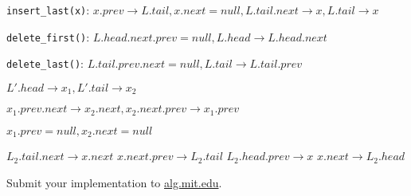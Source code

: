 \documentclass[12pt,twoside]{article}
\begin{document}
\begin{problems}
\begin{problemparts}
\verb|insert_last(x)|: $x.prev\rightarrow L.tail, x.next=null, L.tail.next\rightarrow x, L.tail\rightarrow x$

\verb|delete_first()|: $L.head.next.prev=null, L.head\rightarrow L.head.next$

\verb|delete_last()|: $L.tail.prev.next=null, L.tail\rightarrow L.tail.prev$


\problempart %

$L'.head \rightarrow x_1, L'.tail \rightarrow x_2$

$x_1.prev.next \rightarrow x_2.next, x_2.next.prev\rightarrow x_1.prev$

$x_1.prev=null,x_2.next=null$

\problempart %


$L_2.tail.next \rightarrow x.next$
$x.next.prev \rightarrow L_2.tail$
$L_2.head.prev \rightarrow x$
$x.next \rightarrow L_2.head$

\problempart Submit your implementation to {\small\url{alg.mit.edu}}.
\end{problemparts}

\end{problems}
\end{document}

